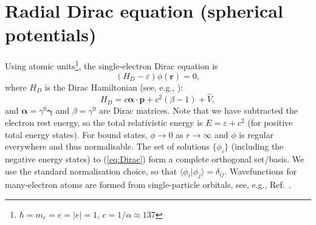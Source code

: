 \documentclass[10pt,twocolumn,a4paper]{article}%
\newcommand{\braket}[1]{\ensuremath{\langle #1\rangle}}	%
\renewcommand{\v}[1]{\ensuremath{\boldsymbol{#1}}}		%
\newcommand{\be}{\begin{equation}}
\newcommand{\ee}{\end{equation}}
\def\h{\ensuremath{\hbar}}
\def\en{\ensuremath{\varepsilon}}
\renewcommand{\b}{\ensuremath{\beta}}
\newcommand{\g}{\ensuremath{\gamma}}
\begin{document}


{\footnotesize
\tableofcontents
}

\section{Radial Dirac equation (spherical potentials)}


Using atomic units\footnote{$\h=m_e=e=|e|=1$, $c=1/\alpha\approx137$}, the single-electron Dirac equation is
\be\label{eq:Dirac}
\left(H_D - \en\right) \phi(\v{r}) = 0,
\ee
where $H_D$ is the Dirac Hamiltonian (see, e.g., \cite{BetheBook}):
\be\label{eq:H-Dirac}
H_D = c \v{\alpha}\cdot\v{p} + c^2(\beta-1) + \hat V,
\ee
and $\v{\alpha} = \g^0\v{\g}$ and $\b=\g^0$ are Dirac matrices.
Note that we have subtracted the electron rest energy, so the total relativistic energy is $E = \en + c^2$ (for positive total energy states).
For bound states, $\phi\to0$ as $r\to\infty$ and $\phi$ is regular everywhere and thus normalisable.
The set of solutions $\{\phi_i\}$ (including the negative energy states) to (\ref{eq:Dirac}) form a complete orthogonal set/basis.
We use the standard normalisation choice, so that $\braket{\phi_i|\phi_j} = \delta_{ij}$.
%
Wavefunctions for many-electron atoms are formed from single-particle orbitals, see, e.g., Ref.~\cite{Lindgren1986}.
\end{document}
